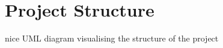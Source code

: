 \documentclass[journal, a4paper]{}
\begin{document}
%
% 
%
\section{Project Structure}

nice UML diagram visualising the structure of the project
%
%
%
%
%
\end{document}
